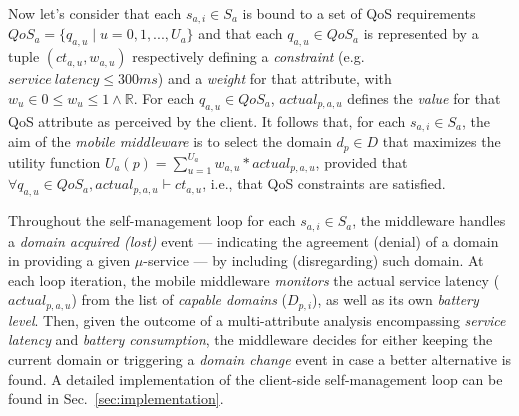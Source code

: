 Now let's consider that each $s_{a,i} \in S_a$ is bound to a set of QoS requirements $QoS_a = \{q_{a,u} \mid u = 0, 1, ..., U_a\}$ and that each $q_{a,u} \in QoS_a$ is represented by a tuple $(ct_{a,u}, w_{a,u})$ respectively defining a \textit{constraint} (e.g. $service\ latency \le 300ms$) and a \textit{weight} for that attribute, with $w_u \in 0 \le w_u \le 1 \wedge \mathbb{R}$. For each $q_{a,u} \in QoS_a$, $actual_{p,a,u}$ defines the \textit{value} for that QoS attribute as perceived by the client. It follows that, for each $s_{a,i} \in S_a$, the aim of the \textit{mobile middleware} is to select the domain $d_p \in D$ 
that maximizes the utility function $U_a(p) = \sum_{u=1}^{U_a} w_{a,u} * actual_{p,a,u}$, provided that $\forall q_{a,u} \in QoS_a, actual_{p,a,u} \vdash ct_{a,u}$, i.e., that QoS constraints are satisfied.

Throughout the self-management loop for each $s_{a,i} \in S_a$, the middleware handles a \textit{domain acquired (lost)} event --- indicating the agreement (denial) of a domain in providing a given $\mu$-service --- by including (disregarding) such domain. At each loop iteration, the mobile middleware \textit{monitors} the actual service latency ($actual_{p,a,u}$) from the list of \textit{capable domains} ($D_{p,i}$), as well as its own \textit{battery level}. Then, given the outcome of a multi-attribute analysis encompassing \textit{service latency} and \textit{battery consumption}, the middleware decides for either keeping the current domain or triggering a \textit{domain change} event in case a better alternative is found. A detailed implementation of the client-side self-management loop can be found in Sec.~\ref{sec:implementation}.




%		
%		
%		
%		


